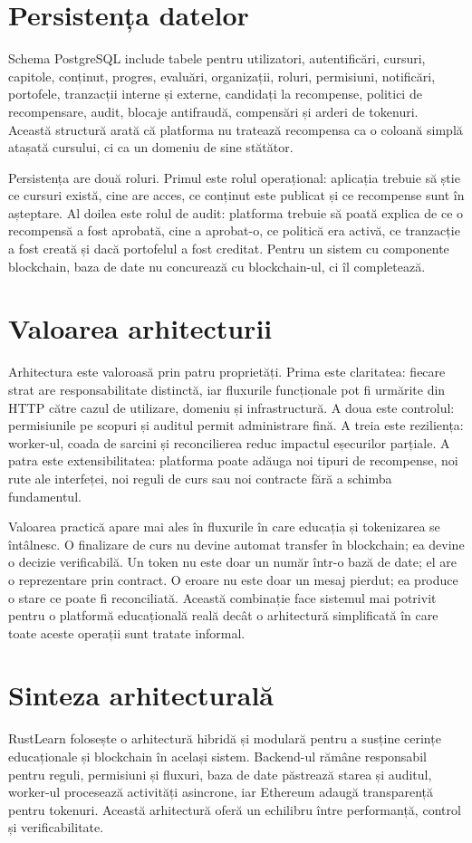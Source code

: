\section{Persistența datelor}
Schema PostgreSQL include tabele pentru utilizatori, autentificări, cursuri, capitole, conținut, progres, evaluări, organizații, roluri, permisiuni, notificări, portofele, tranzacții interne și externe, candidați la recompense, politici de recompensare, audit, blocaje antifraudă, compensări și arderi de tokenuri. Această structură arată că platforma nu tratează recompensa ca o coloană simplă atașată cursului, ci ca un domeniu de sine stătător.

Persistența are două roluri. Primul este rolul operațional: aplicația trebuie să știe ce cursuri există, cine are acces, ce conținut este publicat și ce recompense sunt în așteptare. Al doilea este rolul de audit: platforma trebuie să poată explica de ce o recompensă a fost aprobată, cine a aprobat-o, ce politică era activă, ce tranzacție a fost creată și dacă portofelul a fost creditat. Pentru un sistem cu componente blockchain, baza de date nu concurează cu blockchain-ul, ci îl completează.



\section{Valoarea arhitecturii}
Arhitectura este valoroasă prin patru proprietăți. Prima este claritatea: fiecare strat are responsabilitate distinctă, iar fluxurile funcționale pot fi urmărite din HTTP către cazul de utilizare, domeniu și infrastructură. A doua este controlul: permisiunile pe scopuri și auditul permit administrare fină. A treia este reziliența: worker-ul, coada de sarcini și reconcilierea reduc impactul eșecurilor parțiale. A patra este extensibilitatea: platforma poate adăuga noi tipuri de recompense, noi rute ale interfeței, noi reguli de curs sau noi contracte fără a schimba fundamentul.

Valoarea practică apare mai ales în fluxurile în care educația și tokenizarea se întâlnesc. O finalizare de curs nu devine automat transfer în blockchain; ea devine o decizie verificabilă. Un token nu este doar un număr într-o bază de date; el are o reprezentare prin contract. O eroare nu este doar un mesaj pierdut; ea produce o stare ce poate fi reconciliată. Această combinație face sistemul mai potrivit pentru o platformă educațională reală decât o arhitectură simplificată în care toate aceste operații sunt tratate informal.

\section{Sinteza arhitecturală}
RustLearn folosește o arhitectură hibridă și modulară pentru a susține cerințe educaționale și blockchain în același sistem. Backend-ul rămâne responsabil pentru reguli, permisiuni și fluxuri, baza de date păstrează starea și auditul, worker-ul procesează activități asincrone, iar Ethereum adaugă transparență pentru tokenuri. Această arhitectură oferă un echilibru între performanță, control și verificabilitate.
